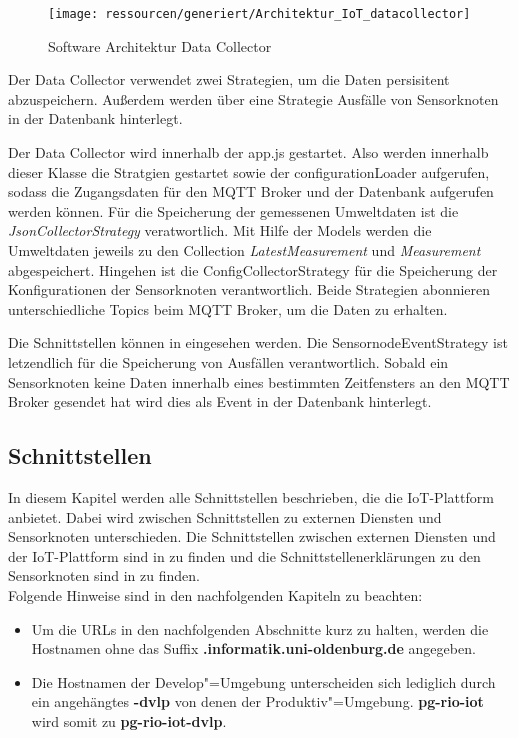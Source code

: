 \begin{figure}[!htb]
	\centering
	\texttt{[image: ressourcen/generiert/Architektur\_IoT\_datacollector]}
	\caption{Software Architektur Data Collector}
	\label{fig:dc}
\end{figure}
Der Data Collector verwendet zwei Strategien, um die Daten persisitent abzuspeichern.
Außerdem werden über eine Strategie Ausfälle von Sensorknoten in der Datenbank hinterlegt.


Der Data Collector wird innerhalb der app.js gestartet.
Also werden innerhalb dieser Klasse die Stratgien gestartet sowie der configurationLoader aufgerufen, sodass die Zugangsdaten für den MQTT Broker und der Datenbank aufgerufen werden können.
Für die Speicherung der gemessenen Umweltdaten ist die \textit{JsonCollectorStrategy} veratwortlich.
Mit Hilfe der Models werden die Umweltdaten jeweils zu den Collection \textit{LatestMeasurement} und \textit{Measurement} abgespeichert.
Hingehen ist die ConfigCollectorStrategy für die Speicherung der Konfigurationen der Sensorknoten verantwortlich.
Beide Strategien abonnieren unterschiedliche Topics beim MQTT Broker, um die Daten zu erhalten.


Die Schnittstellen können in  eingesehen werden.
Die SensornodeEventStrategy ist letzendlich für die Speicherung von Ausfällen verantwortlich.
Sobald ein Sensorknoten keine Daten innerhalb eines bestimmten Zeitfensters an den MQTT Broker gesendet hat wird dies als Event in der Datenbank hinterlegt.
\FloatBarrier

\subsection{Schnittstellen}
\label{sec:arch:iot:schnittstelleniot}
In diesem Kapitel werden alle Schnittstellen beschrieben, die die IoT-Plattform anbietet.
Dabei wird zwischen Schnittstellen zu externen Diensten und Sensorknoten unterschieden.
Die Schnittstellen zwischen externen Diensten und der IoT-Plattform sind in  zu finden und die Schnittstellenerklärungen zu den Sensorknoten sind in  zu finden.
\\
Folgende Hinweise sind in den nachfolgenden Kapiteln zu beachten:
\begin{itemize}
	\item Um die URLs in den nachfolgenden Abschnitte kurz zu halten, werden die Hostnamen ohne das Suffix \textbf{.informatik.uni-oldenburg.de} angegeben.
	\item Die Hostnamen der Develop"=Umgebung unterscheiden sich lediglich durch ein angehängtes \textbf{-dvlp} von denen der Produktiv"=Umgebung. \textbf{pg-rio-iot} wird somit zu \textbf{pg-rio-iot-dvlp}.
\end{itemize}

